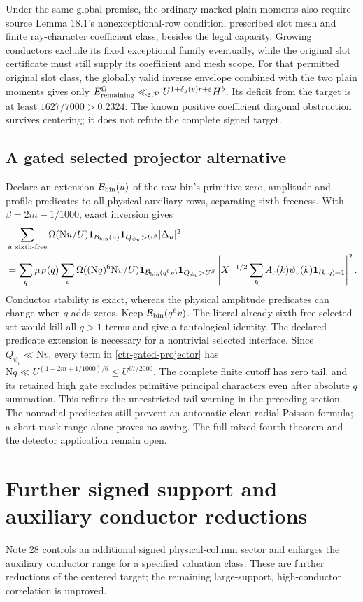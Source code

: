 \documentclass[11pt]{article}
\theoremstyle{definition}
\newcommand{\N}{\mathrm N}
\newcommand{\eps}{\varepsilon}
\newcommand{\Id}{\mathbf 1}
\newcommand{\lls}{\ll_{\eps,\mathcal P}}
\begin{document}
Under the same global premise, the ordinary marked plain moments
also require source Lemma 18.1's nonexceptional-row condition,
prescribed slot mesh and finite ray-character coefficient class,
besides the legal capacity. Growing conductors exclude its fixed
exceptional family eventually, while the original slot certificate
must still supply its coefficient and mesh scope.
For that permitted original slot class, the globally valid inverse
envelope combined with the two plain moments gives only
$E_{\rm remaining}^\Omega\lls U^{1+\delta_g(v)r+\eps}H^b$.
Its deficit from the target is at least $1627/7000>0.2324$.
The known positive coefficient diagonal obstruction survives centering;
it does not refute the complete signed target.

\subsection{A gated selected projector alternative}
Declare an extension $\mathcal B_{\rm bin}(u)$ of the raw bin's primitive-zero,
amplitude and profile predicates to all physical auxiliary rows,
separating sixth-freeness. With $\beta=2m-1/1000$, exact inversion gives
\begin{align}\label{ctr-gated-projector}
 &\sum_{u\ {\rm sixth\text{-}free}}\Omega(\N u/U)
  \Id_{\mathcal B_{\rm bin}(u)}\Id_{Q_{\psi_u}>U^\beta}|\Delta_u|^2\notag\\
 &=\sum_q\mu_F(q)\sum_v\Omega((\N q)^6\N v/U)
  \Id_{\mathcal B_{\rm bin}(q^6v)}\Id_{Q_{\psi_v}>U^\beta}
  \left|X^{-1/2}\sum_k A_c(k)\psi_v(k)\Id_{(k,q)=1}\right|^2 .
\end{align}
Conductor stability is exact, whereas the physical amplitude predicates
can change when $q$ adds zeros. Keep $\mathcal B_{\rm bin}(q^6v)$.
The literal already sixth-free selected set would kill all $q>1$
terms and give a tautological identity. The declared predicate extension
is necessary for a nontrivial selected interface.
Since $Q_{\psi_v}\ll\N v$, every term in
\eqref{ctr-gated-projector} has
$\N q\ll U^{(1-2m+1/1000)/6}\le U^{67/2000}$.
The complete finite cutoff has zero tail, and its retained high gate
excludes primitive principal characters even after absolute $q$ summation.
This refines the unrestricted tail warning in the preceding section.
The nonradial predicates still prevent an automatic clean radial
Poisson formula; a short mask range alone proves no saving.
The full mixed fourth theorem and the detector application remain open.


\section{Further signed support and auxiliary conductor reductions}
\label{sh-sec}
Note 28 \cite{n28} controls an additional signed physical-column sector
and enlarges the auxiliary conductor range for a specified valuation
class. These are further reductions of the centered target; the remaining
large-support, high-conductor correlation is unproved.
\end{document}

